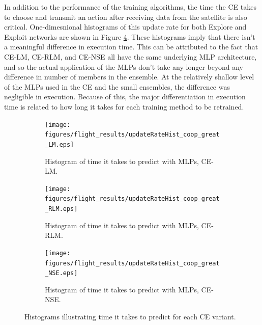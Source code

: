 \FloatBarrier
\par In addition to the performance of the training algorithms, the time the CE takes to choose and transmit an action after receiving data from the satellite is also critical. One-dimesnional histograms of this update rate for both Explore and Exploit networks are shown in Figure \ref{fig:histExecTimes}. These histograms imply that there isn't a meaningful difference in execution time. This can be attributed to the fact that CE-LM, CE-RLM, and CE-NSE all have the same underlying MLP architecture, and so the actual application of the MLPs don't take any longer beyond any difference in number of members in the ensemble. At the relatively shallow level of the MLPs used in the CE and the small ensembles, the difference was negligible in execution. Because of this, the major differentiation in execution time is related to how long it takes for each training method to be retrained.
\begin{figure}[ht]
\begin{subfigure}{0.3\linewidth}
\centering
\texttt{[image: figures/flight\_results/updateRateHist\_coop\_great\_LM.eps]}
\caption{Histogram of time it takes to predict with MLPs, CE-LM.}
\label{fig:flightCoopGreatLMExecTime}
\end{subfigure} \hfill%
\begin{subfigure}{0.3\linewidth}
\centering
\texttt{[image: figures/flight\_results/updateRateHist\_coop\_great\_RLM.eps]}
\caption{Histogram of time it takes to predict with MLPs, CE-RLM.}
\label{fig:flightCoopGreatLMExecTime}
\end{subfigure}\hfill%
\begin{subfigure}{0.3\linewidth}
\centering
\texttt{[image: figures/flight\_results/updateRateHist\_coop\_great\_NSE.eps]}
\caption{Histogram of time it takes to predict with MLPs, CE-NSE.}
\label{fig:flightCoopGreatNSEExecTime}
\end{subfigure}
\caption{Histograms illustrating time it takes to predict for each CE variant.}
\label{fig:histExecTimes}
\end{figure}

